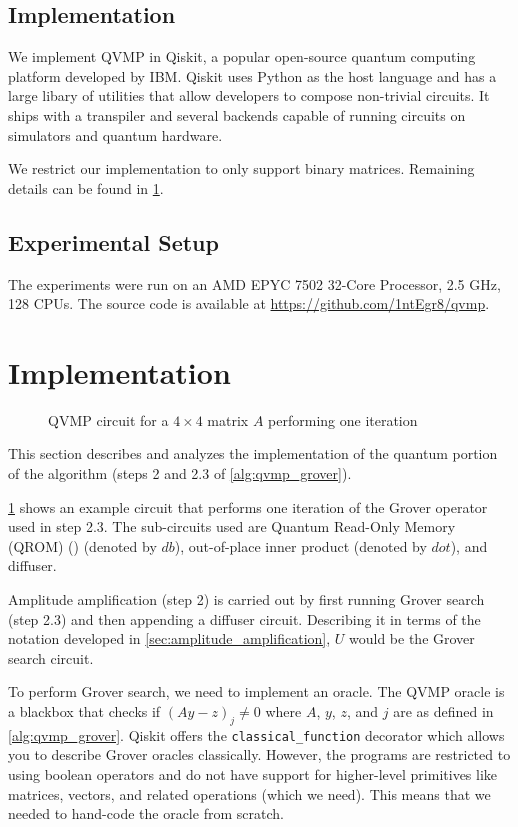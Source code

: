 \documentclass[11pt]{article}
\theoremstyle{definition}
\theoremstyle{remark}
\begin{document}
\subsection{Implementation}

We implement QVMP in Qiskit, a popular open-source quantum computing platform developed by IBM.
Qiskit uses Python as the host language and has a large libary of utilities that allow
developers to compose non-trivial circuits. It ships with a transpiler and
several backends capable of running circuits on simulators and quantum hardware.

We restrict our implementation to only support binary matrices. Remaining
details can be found in \cref{sec:analysis}.

\subsection{Experimental Setup}

The experiments were run on an AMD EPYC 7502 32-Core Processor, 2.5 GHz, 128
CPUs. The source code is available at \url{https://github.com/1ntEgr8/qvmp}.

\section{Implementation} \label{sec:analysis}

\begin{figure}
  \centering
  \scalebox{1.0}{}
  \caption{QVMP circuit for a $4 \times 4$ matrix $A$ performing one iteration}
  \label{fig:qvmp_oracle_4x4}
\end{figure}

This section describes and analyzes the implementation of the quantum portion of
the algorithm (steps 2 and 2.3 of \cref{alg:qvmp_grover}). 

\cref{fig:qvmp_oracle_4x4} shows an example circuit that performs one
iteration of the Grover operator used in step 2.3. The sub-circuits used are
Quantum Read-Only Memory (QROM) (\cite{babbush2018encoding}) (denoted by $db$), out-of-place
inner product (denoted by $dot$), and diffuser.

Amplitude amplification (step 2) is carried out by first running Grover
search (step 2.3) and then appending a diffuser circuit. Describing it in terms
of the notation developed in \cref{sec:amplitude_amplification}, $U$ would be
the Grover search circuit.

To perform Grover search, we need to implement an oracle. The QVMP oracle is a
blackbox that checks if $(Ay - z)_j \neq 0$ where $A$, $y$, $z$, and $j$ are as
defined in \cref{alg:qvmp_grover}. Qiskit offers the \verb+classical_function+
decorator which allows you to describe Grover oracles classically. However, the
programs are restricted to using boolean operators and do not have support for
higher-level primitives like matrices, vectors, and related operations (which we
need). This means that we needed to hand-code the oracle from scratch.
\end{document}
